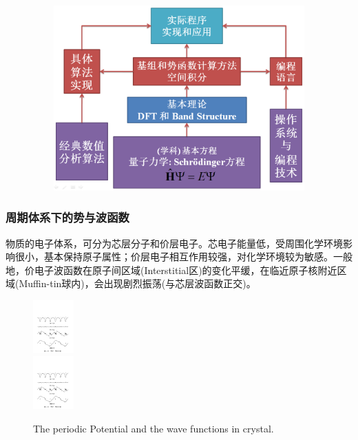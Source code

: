 \documentclass[cjk,slidestop,compress,mathserif,blue]{beamer}
\begin{document}
\frame
{
\begin{figure}[h!]
\vspace*{-0.25in}
\centering
\includegraphics[height=2.80in,width=4.95in,viewport=5 3 1250 780,clip]{Figures/Method_Procedure.png}
\label{Method-Procedure}
\end{figure}
}

\frame
{
\frametitle{周期体系下的势与波函数}
物质的电子体系，可分为芯层分子和价层电子。芯电子能量低，受周围化学环境影响很小，基本保持原子属性；价层电子相互作用较强，对化学环境较为敏感。一般地，价电子波函数在原子间区域(\textrm{Interstitial}区)的变化平缓，在临近原子核附近区域(\textrm{Muffin-tin}球内)，会出现剧烈振荡(与芯层波函数正交)。
\begin{figure}[h!]
\centering
\includegraphics[height=0.8in,width=4.in,viewport=41 433 539 546,clip]{Figures/Pseudo_wave.pdf}\\
\includegraphics[height=0.8in,width=4.in,viewport=41 210 539 339,clip]{Figures/Pseudo_wave.pdf}
\caption{\small \textrm{The periodic Potential and the wave functions in crystal.}}%
\label{Potential-Wave}
\end{figure}
}
\end{document}
